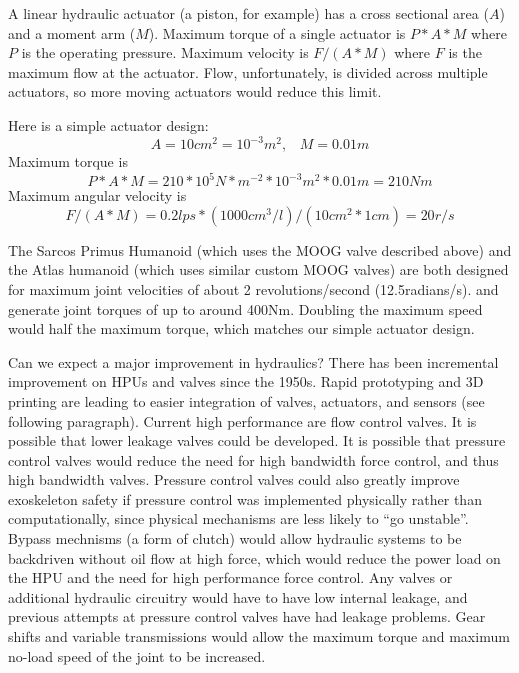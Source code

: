 \documentclass[letterpaper,12pt,fullpage]{article}
\begin{document}
A linear hydraulic actuator (a piston, for example) has a cross sectional
area ($A$) and a moment arm ($M$). Maximum torque of a single actuator
is $P*A*M$ where $P$ is the operating pressure.
Maximum velocity is $F/(A*M)$ where $F$ is the maximum flow at the
actuator.
Flow, unfortunately, is divided across multiple actuators,
so more moving actuators would reduce this limit.

Here is a simple actuator design:
\begin{equation}
A = 10cm^2 = 10^{-3}m^2, \; \; \; M = 0.01m
\end{equation}
Maximum torque is
\begin{equation}
P*A*M = 210*10^5N*m^{-2}*10^{-3}m^2*0.01m = 210Nm 
\end{equation}
Maximum angular velocity is
\begin{equation}
F/(A*M) = 0.2lps*(1000cm^3/l)/(10cm^2*1cm) = 20r/s
\end{equation}

The Sarcos Primus Humanoid (which uses the MOOG valve described
above) and the Atlas humanoid (which uses similar custom MOOG valves)
are both designed
for maximum joint velocities of about 2 revolutions/second (12.5radians/s).
and generate joint torques of up to around 400Nm.
Doubling the maximum speed would half the maximum torque, which matches
our simple actuator design.

Can we expect a major improvement in hydraulics?
There has been incremental improvement on HPUs and valves since
the 1950s. Rapid prototyping and 3D printing are leading to
easier integration of valves, actuators, and sensors (see following
paragraph). Current high performance are flow control valves. It
is possible that lower leakage valves could be developed. It is possible
that pressure control valves would reduce the need for high bandwidth
force control, and thus high bandwidth valves. Pressure control valves
could also greatly improve exoskeleton safety if pressure control was
implemented physically rather than computationally, since physical
mechanisms are less likely to ``go unstable''.
Bypass mechnisms (a form of clutch) would allow hydraulic systems
to be backdriven without oil flow at high force, which would reduce
the power load on the HPU and the need for high performance force control.
Any valves or additional hydraulic circuitry
would have to have low internal leakage, and previous attempts at
pressure control valves have had leakage problems.
Gear shifts and variable transmissions would allow the maximum torque
and maximum no-load speed of the joint to be increased.
\end{document}
